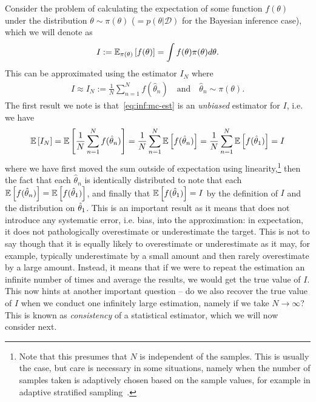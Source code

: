 Consider the problem of calculating the expectation of some function
$f(\theta)$ under the distribution $\theta\sim \pi(\theta)$ ($= p(\theta | \mathcal{D})$ for the Bayesian
inference case), which we will denote 
as
\begin{align}
	\label{eq:inf:expt}
I:=\mathbb{E}_{\pi(\theta)} \left[f(\theta)\right]=\int f(\theta) \pi(\theta) d\theta.
\end{align}
This can be approximated using the \mc estimator $I_N$ where
\begin{align}
	\label{eq:inf:mc-est}
	I \approx I_N := \frac{1}{N} \sum_{n=1}^{N}f(\hat{\theta}_n)
	\quad \text{and} \quad \hat{\theta}_n \sim \pi(\theta).
\end{align}
The first result we note is that~\eqref{eq:inf:mc-est} is an \emph{unbiased} estimator for $I$, i.e. we have
\begin{align}
\label{eq:inf:unbiased}
\mathbb{E} \left[I_N\right] = \mathbb{E} \left[\frac{1}{N} \sum_{n=1}^{N}f(\hat{\theta}_n)\right]
= \frac{1}{N} \sum_{n=1}^{N} \mathbb{E} \left[f(\hat{\theta}_n)\right]
= \frac{1}{N} \sum_{n=1}^{N} \mathbb{E} \left[f(\hat{\theta}_1)\right]
= I
\end{align}
where we have first moved the sum outside of expectation using
linearity,\footnote{Note that this presumes that $N$ is independent
	of the samples.  This is usually the case, but care is necessary in some situations, namely when
	the number of samples taken is adaptively chosen based on the sample values, for example in
	adaptive stratified sampling~\citep{etore2010adaptive}.}
then the fact that each $\hat{\theta}_n$ is identically distributed to note that
each $\mathbb{E} \left[f(\hat{\theta}_n)\right]= \mathbb{E} \left[f(\hat{\theta}_1)\right]$, and finally
that $\mathbb{E} \left[f(\hat{\theta}_1)\right] = I$ by the definition of $I$ and the distribution
on $\hat{\theta}_1$.  This is an important result as it means that \mc does not introduce
any systematic error, i.e. bias, into the approximation: in expectation, it does not
pathologically overestimate or underestimate the target.  This is not to say though that it is
equally likely to overestimate or underestimate as it may, for example, typically underestimate
by a small amount and then rarely overestimate by a large amount.  Instead, it means that if we
were to repeat the estimation an infinite number of times and average the results, we would
get the true value of $I$.  This now hints at another important question -- do we also
recover the true value of $I$ when we conduct one infinitely large estimation, namely if we
take $N\rightarrow\infty$?  This is known as \emph{consistency} of a statistical estimator,
which we will now consider next.  

